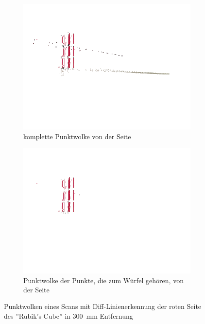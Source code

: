 \documentclass[ngerman,a4paper,parskip=half]{scrartcl}
\begin{document}
\begin{figure}[H]
\begin{subfigure}{0.45\textwidth}
		\includegraphics[width=\textwidth,frame]{includes/diff_red_pos1.png}
		\caption{komplette Punktwolke von der Seite \\ \mbox{}}
	\end{subfigure}
	\hfill
	\begin{subfigure}{0.45\textwidth}
		\includegraphics[width=\textwidth,frame]{includes/diff_only_red_pos1.png}
		\caption{Punktwolke der Punkte, die zum Würfel gehören, von der Seite}
	\end{subfigure}
	\caption{Punktwolken eines Scans mit Diff-Linienerkennung der roten Seite des ''Rubik's Cube'' in 300~mm Entfernung}
\end{figure}
\end{document}
